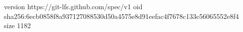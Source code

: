 version https://git-lfs.github.com/spec/v1
oid sha256:6ecb0858f8a937127088530d50a4575e8d91eefac4f7678c133c56065552e8f4
size 1182
